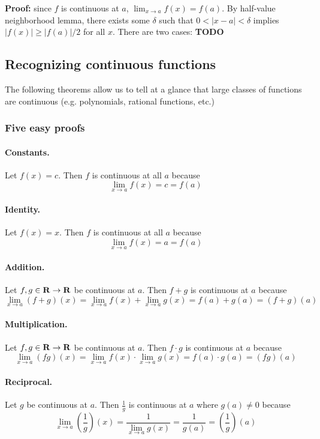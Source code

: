 \vs

\textbf{Proof:} since $f$ is continuous at $a$,
$\lim_{x\to a}f(x)=f(a)$. By half-value neighborhood lemma, there exists
some $\delta$ such that $0<|x-a|<\delta$ implies $|f(x)|\geq|f(a)|/2$ for all $x$.
There are two cases: \textbf{TODO}


\subsection{Recognizing continuous functions}
The following theorems allow us to tell at a glance that large classes
of functions are continuous (e.g. polynomials, rational functions,
etc.)

\subsubsection*{Five easy proofs}

\paragraph{Constants.} Let $f(x)=c$. Then $f$ is continuous at all $a$
because
\[\lim_{x\to a}f(x)=c=f(a)\]

\paragraph{Identity.} Let $f(x)=x$. Then $f$ is continuous at all $a$
because
\[\lim_{x\to a}f(x)=a=f(a)\]

\paragraph{Addition.} Let $f,g\in\mathbf{R}\to\mathbf{R}$ be continuous at $a$. Then
$f+g$ is continuous at $a$ because
\[\lim_{x\to a}(f+g)(x)=\lim_{x\to a}f(x)+\lim_{x\to a}g(x)=f(a)+g(a)=(f+g)(a)\]

\paragraph{Multiplication.} Let $f,g\in\mathbf{R}\to\mathbf{R}$ be continuous at $a$. Then
$f\cdot g$ is continuous at $a$ because
\[\lim_{x\to a}(fg)(x)=\lim_{x\to a}f(x)\cdot\lim_{x\to a}g(x)=f(a)\cdot g(a)=(fg)(a)\]

\paragraph{Reciprocal.} Let $g$ be continuous at $a$. Then $\frac{1}{g}$
is continuous at $a$ where $g(a)\neq 0$ because
\[\lim_{x\to a}\left(\frac{1}{g}\right)(x)=\frac{1}{\lim_{x\to a}g(x)}=\frac{1}{g(a)}=\left(\frac{1}{g}\right)(a)\]

